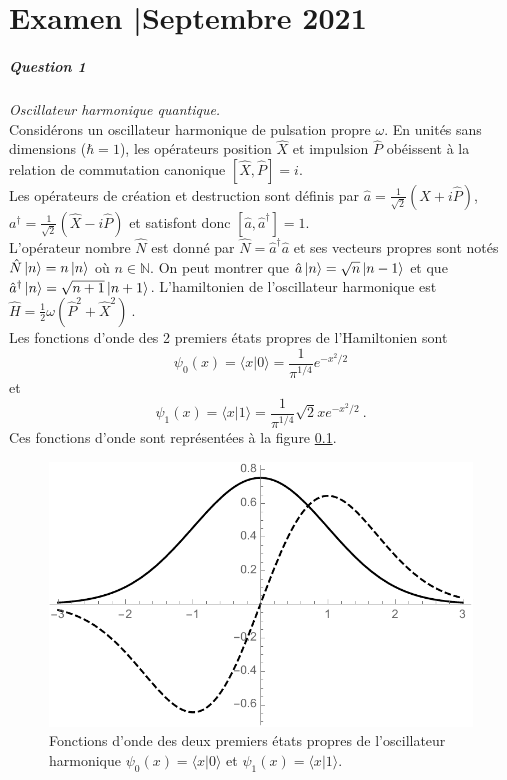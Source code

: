 
\chapter*{Examen \hsp\textcolor{gray75}{|}\hsp Septembre 2021}

\paragraph{Question 1} \textit{Oscillateur harmonique quantique.} \\

Considérons un oscillateur harmonique de pulsation propre $\omega$. En unités sans dimensions ($\hbar=1$), les opérateurs position $\hat X$ et impulsion $\hat P$ obéissent à la relation de commutation canonique $[\hat X, \hat P]=i $. \\

Les opérateurs de création et destruction sont définis par 
$\hat a= \frac{1}{\sqrt{2}}(\hat X+i\hat P)$, $a^\dagger= \frac{1}{\sqrt{2}}(\hat X-i\hat P)$ et satisfont donc $[\hat a,\hat a^\dagger]=1$. \\

L'opérateur nombre $\hat N$ est donné par $\hat N= \hat a^\dagger \hat a$ et ses vecteurs propres sont notés $\hat N \ket{n} =n \ket{n}$ où $n \in \mathbb{N}$. On peut montrer que $\hat a \ket{n} =\sqrt{n} \ket{n-1}$ et que $\hat a^\dagger \ket{n} =\sqrt{n+1} \ket{n+1}$. L'hamiltonien de l'oscillateur harmonique est $\hat H = \frac{1}{2}\omega ( \hat P^2 + \hat X^2 )\ $. \\

Les fonctions d'onde des 2 premiers états propres de l'Hamiltonien sont 
$$\psi_0(x)=\langle x \vert 0\rangle = \frac{1}{\pi^{1/4}} e^{-x^2/2}$$
et
$$\psi_1(x)=\langle x \vert 1\rangle = \frac{1}{\pi^{1/4}} \sqrt{2} x e^{-x^2/2}\ .$$
Ces fonctions d'onde sont représentées à la figure \ref{fig:Psi01}.


\begin{figure}[h!]
\begin{center}
\includegraphics[width=0.5\columnwidth]{Pictures/Psi0Psi1.pdf} 
\end{center}
\caption{Fonctions d'onde des deux premiers états propres de l'oscillateur harmonique $\psi_0(x)=\langle x \vert 0\rangle$ et $\psi_1(x)=\langle x \vert 1\rangle$. }
\label{fig:Psi01}
\end{figure}

